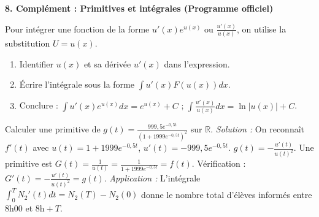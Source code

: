 \documentclass[11pt]{article}
\begin{document}
\begin{exoresolu}
\medskip
\noindent \textbf{8. Complément : Primitives et intégrales (Programme officiel)}
\begin{methode}
Pour intégrer une fonction de la forme $u'(x) e^{u(x)}$ ou $\frac{u'(x)}{u(x)}$, on utilise la substitution $U = u(x)$.
\begin{enumerate}
    \item Identifier $u(x)$ et sa dérivée $u'(x)$ dans l'expression.
    \item Écrire l'intégrale sous la forme $\int u'(x) F(u(x)) dx$.
    \item Conclure : $\int u'(x) e^{u(x)} dx = e^{u(x)} + C$ ; $\int \frac{u'(x)}{u(x)} dx = \ln|u(x)| + C$.
\end{enumerate}
\end{methode}
\begin{exemplebox}
Calculer une primitive de $g(t) = \frac{999,5 e^{-0,5 t}}{(1+1999 e^{-0,5 t})^2}$ sur $\mathbb{R}$.
\emph{Solution :} On reconnaît $f'(t)$ avec $u(t) = 1+1999 e^{-0,5 t}$, $u'(t) = -999,5 e^{-0,5 t}$.
$g(t) = -\frac{u'(t)}{u(t)^2}$. Une primitive est $G(t) = \frac{1}{u(t)} = \frac{1}{1+1999 e^{-0,5 t}} = f(t)$.
Vérification : $G'(t) = -\frac{u'(t)}{u(t)^2} = g(t)$.
\emph{Application :} L'intégrale $\int_0^T N_2'(t) dt = N_2(T) - N_2(0)$ donne le nombre total d'élèves informés entre 8h00 et $8\text{h}+T$.
\end{exemplebox}
\end{exoresolu}
\end{document}
